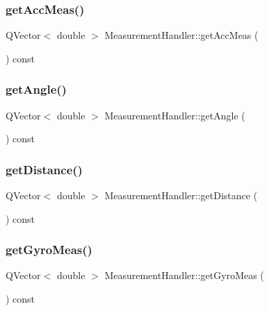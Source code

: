 \subsubsection{\texorpdfstring{get\+Acc\+Meas()}{getAccMeas()}}
{\footnotesize\ttfamily Q\+Vector$<$ double $>$ Measurement\+Handler\+::get\+Acc\+Meas (\begin{DoxyParamCaption}{ }\end{DoxyParamCaption}) const}

\mbox{\label{class_measurement_handler_a95251b5abed0a716be546e4c58f48910}} 
\subsubsection{\texorpdfstring{get\+Angle()}{getAngle()}}
{\footnotesize\ttfamily Q\+Vector$<$ double $>$ Measurement\+Handler\+::get\+Angle (\begin{DoxyParamCaption}{ }\end{DoxyParamCaption}) const}

\mbox{\label{class_measurement_handler_a4d4422673f5deb300499051df34dec30}} 
\subsubsection{\texorpdfstring{get\+Distance()}{getDistance()}}
{\footnotesize\ttfamily Q\+Vector$<$ double $>$ Measurement\+Handler\+::get\+Distance (\begin{DoxyParamCaption}{ }\end{DoxyParamCaption}) const}

\mbox{\label{class_measurement_handler_a80a29ba6bdd4aff53041f4c7f6ae90bd}} 
\subsubsection{\texorpdfstring{get\+Gyro\+Meas()}{getGyroMeas()}}
{\footnotesize\ttfamily Q\+Vector$<$ double $>$ Measurement\+Handler\+::get\+Gyro\+Meas (\begin{DoxyParamCaption}{ }\end{DoxyParamCaption}) const}

